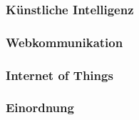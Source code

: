 
\subsubsection{Künstliche Intelligenz}


\subsubsection{Webkommunikation}


\subsubsection{Internet of Things}


\subsubsection{Einordnung}

